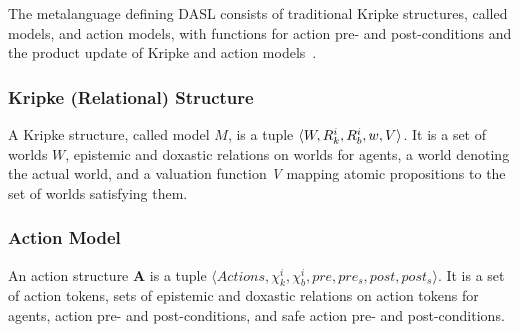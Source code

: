 The metalanguage defining DASL consists of traditional Kripke structures, called models, and action models, with functions for action pre- and post-conditions and the product update of Kripke and action models~\cite{DEL}.

\subsubsection{Kripke (Relational) Structure}%
A Kripke structure, called model $M$, is a tuple $\langle W, R_{k}^i, R_{b}^i, w, V \rangle$. It is a set of worlds $W$, epistemic and doxastic relations on worlds for agents, a world denoting the actual world, and a valuation function \emph{V} mapping atomic propositions to the set of worlds satisfying them.

\subsubsection{Action Model}
An action structure $\mathbf{A}$ is a tuple $\langle Actions,\chi_{k}^i, \chi_{b}^i, pre, pre_s, post, post_s \rangle$. It is a set of action tokens, sets of epistemic and doxastic relations on action tokens for agents, action pre- and post-conditions, and safe action pre- and post-conditions. 

